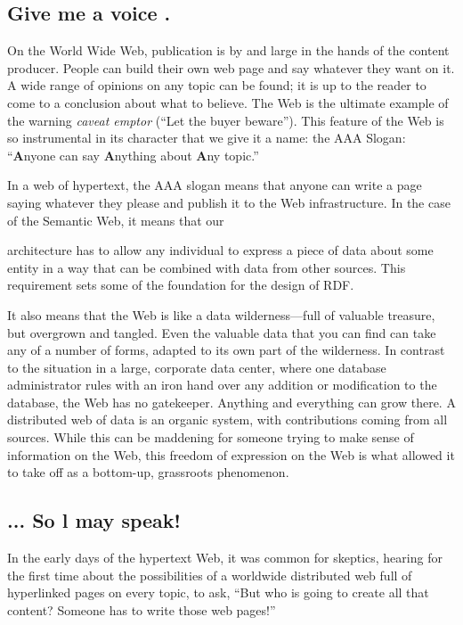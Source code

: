 \subsection{Give me a voice .}

On the World Wide Web, publication is by and large in the hands of the
content producer. People can build their own web page and say whatever
they want on it. A wide range of opinions on any topic can be found; it
is up to the reader to come to a conclusion about what to believe. The
Web is the ultimate example of the warning \emph{caveat emptor} (``Let
the buyer beware''). This feature of the Web is so instrumental in its
character that we give it a name: the AAA Slogan: ``\textbf{A}nyone can
say \textbf{A}nything about \textbf{A}ny topic.''

In a web of hypertext, the AAA slogan means that anyone can write a page
saying whatever they please and publish it to the Web infrastructure. In
the case of the Semantic Web, it means that our

architecture has to allow any individual to express a piece of data
about some entity in a way that can be combined with data from other
sources. This requirement sets some of the foundation for the design of
RDF.

It also means that the Web is like a data wilderness---full of valuable
treasure, but overgrown and tangled. Even the valuable data that you can
find can take any of a number of forms, adapted to its own part of the
wilderness. In contrast to the situation in a large, corporate data
center, where one database administrator rules with an iron hand over
any addition or modification to the database, the Web has no gatekeeper.
Anything and everything can grow there. A distributed web of data is an
organic system, with contributions coming from all sources. While this
can be maddening for someone trying to make sense of information on the
Web, this freedom of expression on the Web is what allowed it to take
off as a bottom-up, grassroots phenomenon.

\subsection{... So l may speak!}

In the early days of the hypertext Web, it was common for skeptics,
hearing for the first time about the possibilities of a worldwide
distributed web full of hyperlinked pages on every topic, to ask, ``But
who is going to create all that content? Someone has to write those web
pages!''

